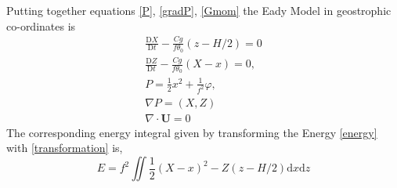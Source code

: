 Putting together equations \ref{P}, \ref{gradP}, \ref{Gmom} the Eady Model in geostrophic co-ordinates is 
\begin{equation}
\begin{aligned}
\frac{\mathrm{D}X}{\mathrm{D}t} -\frac{Cg}{f\theta _0}\left(z-H/2\right) = 0 \\
\frac{\mathrm{D}Z}{\mathrm{D}t} - \frac{Cg}{f\theta_0}\left(X - x\right) = 0,\\
P = \frac{1}{2}x^2 + \frac{1}{f^2}\varphi,\\
\nabla P = (X,Z)\\
\nabla \cdot \bm{U} = 0
\end{aligned}
\label{EadyGC}
\end{equation}
The corresponding energy integral given by transforming the Energy \ref{energy} with \ref{transformation} is,
\begin{equation}
E = f^2 \iint \frac{1}{2}\left(X-x\right)^2 - Z\left(z - H/2\right)\textrm{d}x\textrm{d}z
\label{energy}
\end{equation}

